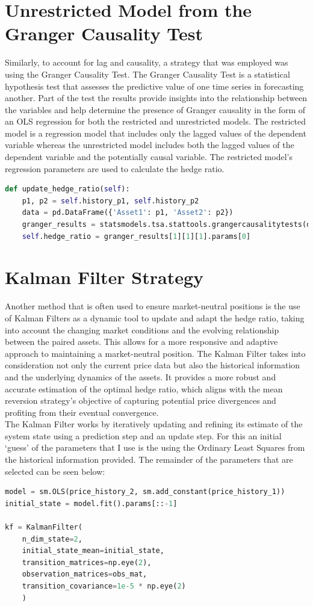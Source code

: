 \section{Unrestricted Model from the Granger Causality Test}
Similarly, to account for lag and causality, a strategy that was employed was using the Granger Causality Test. The Granger Causality Test is a statistical hypothesis test that assesses the predictive value of one time series in forecasting another. Part of the test the results provide insights into the relationship between the variables and help determine the presence of Granger causality in the form of an OLS regression for both the restricted and unrestricted models. The restricted model is a regression model that includes only the lagged values of the dependent variable whereas the unrestricted model includes both the lagged values of the dependent variable and the potentially causal variable. The restricted model's regression parameters are used to calculate the hedge ratio.
\begin{lstlisting}[language=Python]
def update_hedge_ratio(self):
    p1, p2 = self.history_p1, self.history_p2
    data = pd.DataFrame({'Asset1': p1, 'Asset2': p2})
    granger_results = statsmodels.tsa.stattools.grangercausalitytests(data, maxlag=[1], verbose=False)
    self.hedge_ratio = granger_results[1][1][1].params[0]
\end{lstlisting}

\section{Kalman Filter Strategy}
Another method that is often used to ensure market-neutral positions is the use of Kalman Filters as a dynamic tool to update and adapt the hedge ratio, taking into account the changing market conditions and the evolving relationship between the paired assets. This allows for a more responsive and adaptive approach to maintaining a market-neutral position. The Kalman Filter takes into consideration not only the current price data but also the historical information and the underlying dynamics of the assets. It provides a more robust and accurate estimation of the optimal hedge ratio, which aligns with the mean reversion strategy's objective of capturing potential price divergences and profiting from their eventual convergence.
\\[5mm]
The Kalman Filter works by iteratively updating and refining its estimate of the system state using a prediction step and an update step. For this an initial `guess' of the parameters that I use is the using the Ordinary Least Squares from the historical information provided. The remainder of the parameters that are selected can be seen below:
\begin{lstlisting}[language=Python]
model = sm.OLS(price_history_2, sm.add_constant(price_history_1))
initial_state = model.fit().params[::-1]

kf = KalmanFilter(
    n_dim_state=2,
    initial_state_mean=initial_state,
    transition_matrices=np.eye(2),
    observation_matrices=obs_mat,
    transition_covariance=1e-5 * np.eye(2)
    )
\end{lstlisting}
\vspace{5mm}

